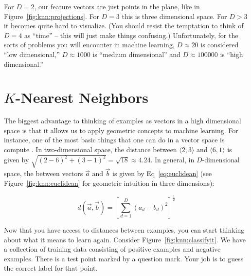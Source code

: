 For $D=2$, our feature vectors are just points in the plane, like in
Figure~\ref{fig:knn:projections}.  For $D=3$ this is three dimensional
space.  For $D>3$ it becomes quite hard to visualize.  (You should
resist the temptation to think of $D=4$ as ``time'' -- this will just
make things confusing.)  Unfortunately, for the sorts of problems you
will encounter in machine learning, $D \approx 20$ is considered ``low
dimensional,'' $D \approx 1000$ is ``medium dimensional'' and $D
\approx 100000$ is ``high dimensional.''


\section[K-Nearest Neighbors]{$K$-Nearest Neighbors}

The biggest advantage to thinking of examples as vectors in a high
dimensional space is that it allows us to apply geometric concepts to
machine learning.  For instance, one of the most basic things that one
can do in a vector space is compute .  In
two-dimensional space, the distance between $\langle 2,3\rangle$ and
$\langle 6,1\rangle$ is given by $\sqrt{(2-6)^2 + (3-1)^2} = \sqrt{18}
\approx 4.24$.  In general, in $D$-dimensional space, the
 between vectors $\vec a$ and $\vec b$ is
given by Eq~\eqref{eq:euclidean} (see Figure~\ref{fig:knn:euclidean}
for geometric intuition in three dimensions):


\begin{equation} \label{eq:euclidean}
d(\vec a, \vec b) = \left[ \sum_{d=1}^D (a_d - b_d)^2 \right]^{\frac 1 2}
\end{equation}




Now that you have access to distances between examples, you can start
thinking about what it means to learn again.  Consider
Figure~\ref{fig:knn:classifyit}.  We have a collection of training
data consisting of positive examples and negative examples.  There is
a test point marked by a question mark.  Your job is to guess the
correct label for that point.

